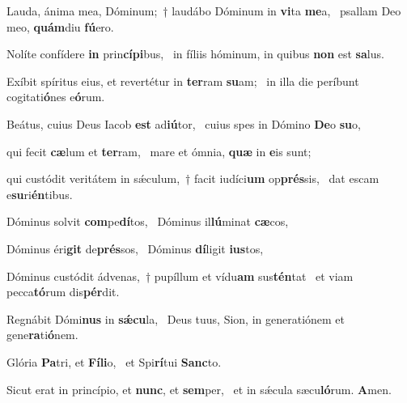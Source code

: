 \item Lauda, ánima mea, Dóminum;~† laudábo Dóminum in \textbf{vi}ta \textbf{me}a,~\psstar{} psallam Deo meo, \textbf{quám}diu \textbf{fú}ero.

\item Nolíte confídere \textbf{in} prin\textbf{cí}\textbf{pi}bus,~\psstar{} in fíliis hóminum, in quibus \textbf{non} est \textbf{sa}lus.

\item Exíbit spíritus eius, et revertétur in \textbf{ter}ram \textbf{su}am;~\psstar{} in illa die períbunt cogitati\textbf{ó}nes e\textbf{ó}rum.

\item Beátus, cuius Deus Iacob \textbf{est} ad\textbf{iú}tor,~\psstar{} cuius spes in Dómino \textbf{De}o \textbf{su}o,

\item qui fecit \textbf{cæ}lum et \textbf{ter}ram,~\psstar{} mare et ómnia, \textbf{quæ} in \textbf{e}is sunt;

\item qui custódit veritátem in sǽculum,~† facit iudíci\textbf{um} op\textbf{prés}sis,~\psstar{} dat escam e\textbf{su}ri\textbf{én}tibus.

\item Dóminus solvit \textbf{com}pe\textbf{dí}tos,~\psstar{} Dóminus il\textbf{lú}minat \textbf{cæ}cos,

\item Dóminus éri\textbf{git} de\textbf{prés}sos,~\psstar{} Dóminus \textbf{dí}ligit \textbf{ius}tos,

\item Dóminus custódit ádvenas,~† pupíllum et vídu\textbf{am} sus\textbf{tén}tat~\psstar{} et viam pecca\textbf{tó}rum dis\textbf{pér}dit.

\item Regnábit Dómi\textbf{nus} in \textbf{sǽ}\textbf{cu}la,~\psstar{} Deus tuus, Sion, in generatiónem et gene\textbf{ra}ti\textbf{ó}nem.

\item Glória \textbf{Pa}tri, et \textbf{Fí}\textbf{li}o,~\psstar{} et Spi\textbf{rí}tui \textbf{Sanc}to.

\item Sicut erat in princípio, et \textbf{nunc}, et \textbf{sem}per,~\psstar{} et in sǽcula sæcu\textbf{ló}rum. \textbf{A}men.